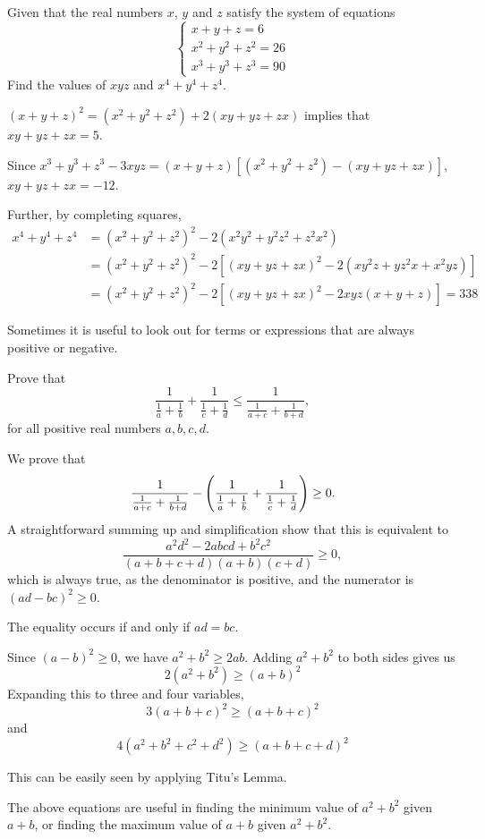 \begin{exercise}
Given that the real numbers $x$, $y$ and $z$ satisfy the system of equations
\[ \begin{cases}
x+y+z=6 \\
x^2+y^2+z^2=26 \\
x^3+y^3+z^3=90
\end{cases} \]
Find the values of $xyz$ and $x^4+y^4+z^4$.
\end{exercise}

\begin{solution}
$(x+y+z)^2=(x^2+y^2+z^2)+2(xy+yz+zx)$ implies that $xy+yz+zx=5$.

Since $x^3+y^3+z^3-3xyz=(x+y+z)[(x^2+y^2+z^2)-(xy+yz+zx)]$, $xy+yz+zx=\boxed{-12}$.

Further, by completing squares,
\begin{align*}
x^4+y^4+z^4 &= (x^2+y^2+z^2)^2-2(x^2y^2+y^2z^2+z^2x^2) \\
&= (x^2+y^2+z^2)^2-2[(xy+yz+zx)^2-2(xy^2z+yz^2x+x^2yz)] \\
&= (x^2+y^2+z^2)^2-2[(xy+yz+zx)^2-2xyz(x+y+z)]=\boxed{338}
\end{align*}
\end{solution}

Sometimes it is useful to look out for terms or expressions that are always positive or negative.

\begin{exercise}
Prove that
\[\frac{1}{\frac{1}{a}+\frac{1}{b}}+\frac{1}{\frac{1}{c}+\frac{1}{d}}\le\frac{1}{\frac{1}{a+c}+\frac{1}{b+d}},\]
for all positive real numbers $a,b,c,d$.
\end{exercise}

\begin{solution}
We prove that
\[\frac{1}{\frac{1}{a+c}+\frac{1}{b+d}}-\left(\frac{1}{\frac{1}{a}+\frac{1}{b}}+\frac{1}{\frac{1}{c}+\frac{1}{d}}\right)\ge0.\]
A straightforward summing up and simplification show that this is equivalent to
\[\frac{a^2d^2-2abcd+b^2c^2}{(a+b+c+d)(a+b)(c+d)}\ge0,\]
which is always true, as the denominator is positive, and the numerator is $(ad-bc)^2\ge0$.

The equality occurs if and only if $ad=bc$.
\end{solution}

Since $(a-b)^2\ge0$, we have $a^2+b^2\ge2ab$. Adding $a^2+b^2$ to both sides gives us
\begin{equation}
2(a^2+b^2)\ge(a+b)^2
\end{equation}
Expanding this to three and four variables,
\begin{equation}
3(a+b+c)^2\ge(a+b+c)^2
\end{equation}
and
\begin{equation}
4(a^2+b^2+c^2+d^2)\ge(a+b+c+d)^2
\end{equation}
\begin{remark}
This can be easily seen by applying Titu's Lemma.
\end{remark}
The above equations are useful in finding the minimum value of $a^2+b^2$ given $a+b$, or finding the maximum value of $a+b$ given $a^2+b^2$.
\pagebreak

